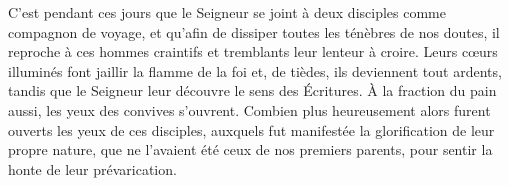 C’est pendant ces jours
	que le Seigneur se joint à deux disciples comme compagnon de voyage,
	et qu’afin de dissiper toutes les ténèbres de nos doutes,
	il reproche à ces hommes craintifs et tremblants leur lenteur à croire.
Leurs cœurs illuminés font jaillir la flamme de la foi
	et, de tièdes, ils deviennent tout ardents,
	tandis que le Seigneur leur découvre le sens des Écritures.
À la fraction du pain aussi, les yeux des convives s’ouvrent.
Combien plus heureusement alors furent ouverts les yeux de ces disciples,
	auxquels fut manifestée la glorification de leur propre nature,
	que ne l’avaient été ceux de nos premiers parents,
	pour sentir la honte de leur prévarication.
